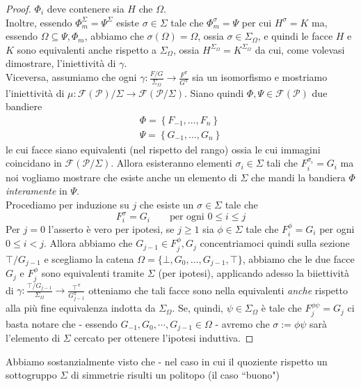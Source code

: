 \documentclass[a4paper,12pt]{report}
\newcommand{\p}{\mathcal{P}}
\theoremstyle{plain}
\theoremstyle{definition}
\newcommand\flag[1]{\mathcal{F}(#1)}
\begin{document}
\begin{proof}
$\Phi_i$ deve contenere sia $H$ che $\Omega$.\\
Inoltre, essendo $\Phi_m^\Sigma=\Psi^\Sigma$ esiste $\sigma\in\Sigma$ tale che $\Phi_m^\sigma=\Psi$ per cui $H^\sigma=K$ ma, essendo
$\Omega\subseteq\Psi,\Phi_m$, abbiamo che $\sigma(\Omega)=\Omega$, ossia $\sigma\in\Sigma_\Omega$, e quindi le facce $H$ e $K$ sono 
equivalenti anche rispetto a $\Sigma_\Omega$, ossia $H^{\Sigma_\Omega}=K^{\Sigma_\Omega}$ da cui, come volevasi dimostrare, l'iniettivit\`a
di $\gamma$.\\
Viceversa, assumiamo che ogni $\gamma:\frac{F/G}{\Sigma_\Omega}\longrightarrow\frac{F^\pi}{G^\pi}$ sia un isomorfismo e mostriamo
l'iniettivit\`a di $\mu:\flag{\p}/\Sigma\longrightarrow\flag{\p/\Sigma}$. Siano quindi $\Phi,\Psi\in\flag{\p}$ due bandiere
\begin{gather*}
\Phi=\left\{F_{-1},\dots,F_n\right\}\\
\Psi=\left\{G_{-1},\dots,G_n\right\}
\end{gather*}
le cui facce siano equivalenti (nel rispetto del rango) ossia le cui immagini coincidano in $\flag{\p/\Sigma}$. Allora esisteranno elementi
$\sigma_i\in\Sigma$ tali che $F_i^{\sigma_i}=G_i$ ma noi vogliamo mostrare che esiste anche un elemento di $\Sigma$ che mandi la bandiera $\Phi$
\emph{interamente} in $\Psi$.\\
Procediamo per induzione su $j$ che esiste un $\sigma\in\Sigma$ tale che
\begin{equation*}
F_i^\sigma=G_i\qquad\text{per ogni }0\leq i\leq j
\end{equation*}
Per $j=0$ l'asserto \`e vero per ipotesi, se $j\geq 1$ sia $\phi\in\Sigma$ tale che $F_i^\phi=G_i$ per ogni $0\leq i<j$.
Allora abbiamo che $G_{j-1}\in F_j^\phi,G_j$ concentriamoci quindi sulla sezione $\top/G_{j-1}$ e scegliamo la catena
$\Omega=\{\bot,G_0,\dots,G_{j-1},\top\}$, abbiamo che le due facce $G_j$ e $F_j^\phi$ sono equivalenti tramite $\Sigma$ (per ipotesi), applicando adesso
la biiettivit\`a di $\gamma:\frac{\top/G_{j-1}}{\Sigma_\Omega}\longrightarrow\frac{\top^\pi}{G_{j-1}^\pi}$ otteniamo che tali facce sono
nella equivalenti \emph{anche} rispetto alla pi\`u fine equivalenza indotta da $\Sigma_\Omega$. Se, quindi, $\psi\in\Sigma_\Omega$ \`e tale
che $F_j^{\phi\psi}=G_j$ ci basta notare che - essendo $G_{-1},G_0,\cdots,G_{j-1}\in\Omega$ - avremo che $\sigma:=\phi\psi$ sar\`a
l'elemento di $\Sigma$ cercato per ottenere l'ipotesi induttiva.
\end{proof}
Abbiamo sostanzialmente visto che - nel caso in cui il quoziente rispetto un sottogruppo $\Sigma$ di simmetrie risulti un politopo (il caso ``buono")
\end{document}
